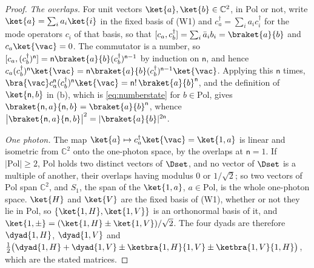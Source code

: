 \begin{proof}
\emph{The overlaps.} For unit vectors $\ket{a},\ket{b}\in\mathbb{C}^2$, in
$\mathrm{Pol}$ or not, write $\ket{a}=\sum_ia_i\ket{i}$ in the fixed basis of
(W1) and $c^{\dagger}_a=\sum_ia_ic^{\dagger}_i$ for the mode operators $c_i$
of that basis, so that $[c_a,c^{\dagger}_b]=\sum_i\bar a_ib_i
=\braket{a}{b}$ and $c_a\ket{\vac}=0$. The commutator is a number, so
$[c_a,(c^{\dagger}_b)^{\mathsf{n}}]=\mathsf{n}\braket{a}{b}
(c^{\dagger}_b)^{\mathsf{n}-1}$ by induction on $\mathsf{n}$, and hence
$c_a(c^{\dagger}_b)^{\mathsf{n}}\ket{\vac}=\mathsf{n}\braket{a}{b}
(c^{\dagger}_b)^{\mathsf{n}-1}\ket{\vac}$. Applying this $\mathsf{n}$ times,
$\bra{\vac}c_a^{\mathsf{n}}(c^{\dagger}_b)^{\mathsf{n}}\ket{\vac}
=\mathsf{n}!\,\braket{a}{b}^{\mathsf{n}}$, and the definition of
$\ket{\mathsf{n},b}$ in (b), which is \eqref{eq:numberstate} for
$b\in\mathrm{Pol}$, gives
$\braket{\mathsf{n},a}{\mathsf{n},b}=\braket{a}{b}^{\mathsf{n}}$, whence
$\big|\braket{\mathsf{n},a}{\mathsf{n},b}\big|^2=|\braket{a}{b}|^{2\mathsf{n}}$.

\emph{One photon.} The map $\ket{a}\mapsto c^{\dagger}_a\ket{\vac}=\ket{1,a}$
is linear and isometric from $\mathbb{C}^2$ onto the one-photon space, by the
overlaps at $\mathsf{n}=1$. If $|\mathrm{Pol}|\ge2$, $\mathrm{Pol}$ holds two
distinct vectors of $\Dset$, and no vector of $\Dset$ is a multiple of another,
their overlaps having modulus $0$ or $1/\sqrt2$; so two vectors of
$\mathrm{Pol}$ span $\mathbb{C}^2$, and $S_1$, the span of the $\ket{1,a}$,
$a\in\mathrm{Pol}$, is the whole one-photon space. $\ket{H}$ and $\ket{V}$ are
the fixed basis of (W1), whether or not they lie in $\mathrm{Pol}$, so
$\{\ket{1,H},\ket{1,V}\}$ is an orthonormal basis of it, and
$\ket{1,\pm}=(\ket{1,H}\pm\ket{1,V})/\sqrt2$. The four dyads are therefore
$\dyad{1,H}$, $\dyad{1,V}$ and $\tfrac12\big(\dyad{1,H}+\dyad{1,V}
\pm\ketbra{1,H}{1,V}\pm\ketbra{1,V}{1,H}\big)$, which are the stated matrices.


\end{proof}
